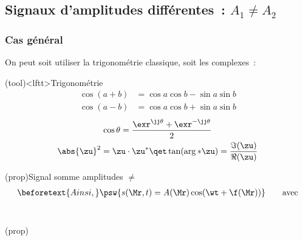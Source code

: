\documentclass[../../main/main.tex]{subfiles}
\begin{document}
\subsection{Signaux d'amplitudes différentes~: $A_1 \neq A_2$}
\subsubsection{Cas général}
On peut soit utiliser la trigonométrie classique, soit les complexes~:
\begin{tcb}[sidebyside](tool)<lftt>{Trigonométrie}
	\vspace*{-15pt}
	\begin{align*}
		\cos(a+b) & = \cos a\cos b - \sin a\sin b \\
		\cos(a-b) & = \cos a\cos b + \sin a\sin b
	\end{align*}
	\tcblower
	\vspace*{-15pt}
	\begin{gather*}
		\cos\theta = \frac{\exr^{\jj\theta}+\exr^{-\jj\theta}}{2}\\
		\abs{\zu}^2 = \zu\cdot\zu^*
		\qet
		\tan (\arg*{\zu}) = \frac{\Im(\zu)}{\Re(\zu)}
	\end{gather*}
\end{tcb}

\begin{tcb}(prop){Signal somme amplitudes $\neq$}
	\vspace{-15pt}
	\begin{gather*}
		\beforetext{Ainsi,}
		\psw{s(\Mr,t) = A(\Mr)\cos(\wt + \f(\Mr))}
		\tag*{avec}
	\end{gather*}
	~
	\vspace{-15pt}
	\smallbreak
	\begin{isd}(prop)
		\vspace{-15pt}
		\psw{%
		\[
			\small
			\boxed{%
			A(\Mr) = \sqrt{A_1{}^2+A_2{}^2 + 2A_1A_2\cos(\D\f_{2/1}(\Mr))
			}
			}
		\]
		}%
		\vspace{-15pt}
		\tcblower
		\vspace{-15pt}
		\psw{%
			\[
				\small
				\boxed{%
					\f(\Mr) = \arctan(
					\dfrac{%
						A_1\sin\f_1(\Mr)+A_2\sin\f_2(\Mr)
					}{
						A_1\cos\f_1(\Mr)+A_2\cos\f_2(\Mr)
					}
					)
				}
			\]
		}%
		\vspace{-15pt}
	\end{isd}
\end{tcb}
\end{document}
